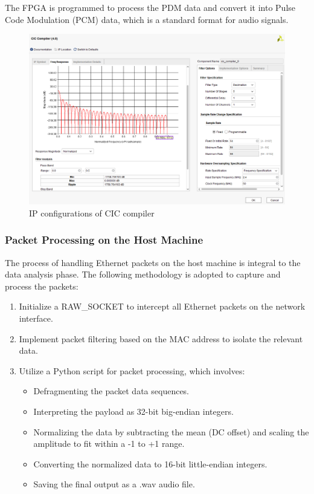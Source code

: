 The FPGA is programmed to process the PDM data and convert it into Pulse Code Modulation (PCM) data, which is a standard format for audio signals.

\begin{figure}[htbp]
\centering
\includegraphics[width=.7\textwidth]{Sections/IMPLEMENTATION/images/cic-ip.png}
\caption{IP configurations of CIC compiler}
\label{fig:cic-ip}
\end{figure}


\subsubsection{Packet Processing on the Host Machine}

The process of handling Ethernet packets on the host machine is integral to the data analysis phase. The following methodology is adopted to capture and process the packets:

\begin{enumerate}
    \item Initialize a RAW\_SOCKET to intercept all Ethernet packets on the network interface.
    \item Implement packet filtering based on the MAC address to isolate the relevant data.
    \item Utilize a Python script for packet processing, which involves:
    \begin{itemize}
        \item Defragmenting the packet data sequences.
        \item Interpreting the payload as 32-bit big-endian integers.
        \item Normalizing the data by subtracting the mean (DC offset) and scaling the amplitude to fit within a -1 to +1 range.
        \item Converting the normalized data to 16-bit little-endian integers.
        \item Saving the final output as a .wav audio file.
    \end{itemize}
\end{enumerate}

